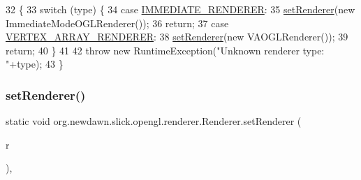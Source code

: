 \begin{DoxyCode}
32                                              \{
33         \textcolor{keywordflow}{switch} (type) \{
34             \textcolor{keywordflow}{case} \mbox{\hyperlink{classorg_1_1newdawn_1_1slick_1_1opengl_1_1renderer_1_1_renderer_a882d9f188c116a6e5258b3e47c47f084}{IMMEDIATE\_RENDERER}}:
35                 \mbox{\hyperlink{classorg_1_1newdawn_1_1slick_1_1opengl_1_1renderer_1_1_renderer_a981940daeedcefe0a84ded27f17b0fc7}{setRenderer}}(\textcolor{keyword}{new} ImmediateModeOGLRenderer());
36                 \textcolor{keywordflow}{return};
37             \textcolor{keywordflow}{case} \mbox{\hyperlink{classorg_1_1newdawn_1_1slick_1_1opengl_1_1renderer_1_1_renderer_a36ea0003dbe799332e5b022ca0290c6c}{VERTEX\_ARRAY\_RENDERER}}:
38                 \mbox{\hyperlink{classorg_1_1newdawn_1_1slick_1_1opengl_1_1renderer_1_1_renderer_a981940daeedcefe0a84ded27f17b0fc7}{setRenderer}}(\textcolor{keyword}{new} VAOGLRenderer());
39                 \textcolor{keywordflow}{return};
40         \}
41         
42         \textcolor{keywordflow}{throw} \textcolor{keyword}{new} RuntimeException(\textcolor{stringliteral}{"Unknown renderer type: "}+type);
43     \}
\end{DoxyCode}
\mbox{\label{classorg_1_1newdawn_1_1slick_1_1opengl_1_1renderer_1_1_renderer_a88ac0b4bc09f731a3ae2cba651e4deeb}} 
\subsubsection{\texorpdfstring{set\+Renderer()}{setRenderer()}\hspace{0.1cm}{\footnotesize\ttfamily [2/2]}}
{\footnotesize\ttfamily static void org.\+newdawn.\+slick.\+opengl.\+renderer.\+Renderer.\+set\+Renderer (\begin{DoxyParamCaption}\item[{\mbox{\hyperlink{interfaceorg_1_1newdawn_1_1slick_1_1opengl_1_1renderer_1_1_s_g_l}{S\+GL}}}]{r }\end{DoxyParamCaption})\hspace{0.3cm}{\ttfamily [inline]}, {\ttfamily [static]}}

